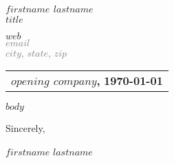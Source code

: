 \documentclass[$size$]{article}
\begin{document}
\begin{center}
    {\Large \textbf{$firstname$ $lastname$}}\\
    \textbf{$title$}
\end{center}

\bigskip

\noindent
\begin{flushright}
\textcolor{gray}
{
\href{$web$}{$web$} \\
$email$ \\
$city$, $state$, $zip$
}
\end{flushright}

\bigskip

\noindent
\begin{tabular}{@{}p{\textwidth}}
\textbf{$opening$ $company$,} \hfill \textbf{\today}
\end{tabular}

\bigskip

$body$

\bigskip

\noindent
Sincerely,

$firstname$ $lastname$

\bigskip

\noindent
\end{document}
